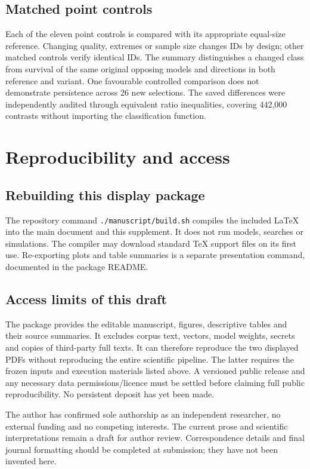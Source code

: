\documentclass[12pt]{article}
\begin{document}
\subsection{Matched point controls}
Each of the eleven point controls is compared with its appropriate equal-size reference. Changing quality, extremes or sample size changes IDs by design; other matched controls verify identical IDs. The summary distinguishes a changed class from survival of the same original opposing models and directions in both reference and variant. One favourable controlled comparison does not demonstrate persistence across 26 new selections. The saved differences were independently audited through equivalent ratio inequalities, covering 442,000 contrasts without importing the classification function.

\FloatBarrier

\section{Reproducibility and access}

\subsection{Rebuilding this display package}
The repository command \nolinkurl{./manuscript/build.sh} compiles the included LaTeX into the main document and this supplement. It does not run models, searches or simulations. The compiler may download standard TeX support files on its first use. Re-exporting plots and table summaries is a separate presentation command, documented in the package README.

\subsection{Access limits of this draft}
The package provides the editable manuscript, figures, descriptive tables and their source summaries. It excludes corpus text, vectors, model weights, secrets and copies of third-party full texts. It can therefore reproduce the two displayed PDFs without reproducing the entire scientific pipeline. The latter requires the frozen inputs and execution materials listed above. A versioned public release and any necessary data permissions/licence must be settled before claiming full public reproducibility. No persistent deposit has yet been made.

The author has confirmed sole authorship as an independent researcher, no external funding and no competing interests. The current prose and scientific interpretations remain a draft for author review. Correspondence details and final journal formatting should be completed at submission; they have not been invented here.

\FloatBarrier


\end{document}
